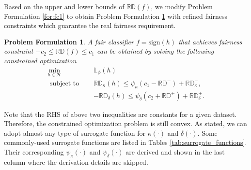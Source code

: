 \documentclass[letterpaper]{article} %
\newcommand{\sign}{\textrm{sign}}
\newcommand{\Loss}{\mathbb{L}}
\newcommand{\RD}{\mathbb{RD}}
\newtheorem{formulation}{Problem Formulation}
\begin{document}
Based on the upper and lower bounds of $\RD(f)$, we modify Problem Formulation \ref{for:fc1} to obtain Problem Formulation \ref{for:fc2} with refined fairness constraints which guarantee the real fairness requirement.

\begin{formulation}\label{for:fc2}
	A fair classifier $f = \sign(h)$ that achieves fairness constraint $-c_{2}\leq \RD(f)\leq c_{1}$ can be obtained by solving the following constrained optimization
	\begin{align}
		\label{opt:refined_fair_classification}
		\min_{ h \in \mathcal{H}} \quad                                   & \Loss_{\phi} (h)                                                               \\
		\nonumber                               \text{ subject to } \quad & \RD_{ \kappa } (h) \leq \psi_{\kappa}( c_{1} - \RD^{-} ) + \RD^{-}_{ \kappa },  \\
		\nonumber                                                         & -\RD_{ \delta } (h) \leq \psi_{\delta}( c_{2} + \RD^{+} ) + \RD^{+}_{ \delta }.
	\end{align}
\end{formulation}
Note that the RHS of above two inequalities are constants for a given dataset. Therefore, the constrained optimization problem is still convex. As stated, we can adopt almost any type of surrogate function for $\kappa(\cdot)$ and $\delta(\cdot)$. Some commonly-used surrogate functions are listed in Tables \ref{tab:surrogate_functions}. Their corresponding $\psi_{\kappa}(\cdot)$ and $\psi_{\delta}(\cdot)$ are derived and shown in the last column where the derivation details are skipped.
\end{document}
